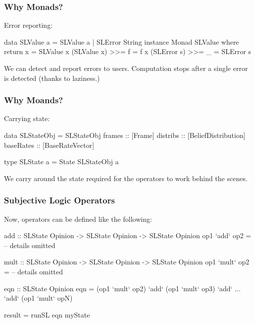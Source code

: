 \documentclass{beamer}
\begin{document}

\begin{frame}[fragile]
\frametitle{Why Monads?}

Error reporting:

\begin{code}
data SLValue a = SLValue a | SLError String
instance Monad SLValue where
  return x = SLValue x
  (SLValue x) >>= f = f x
  (SLError s) >>= _ = SLError s
\end{code}

We can detect and report errors to users. Computation stops after a single
error is detected (thanks to laziness.)

\end{frame}


\begin{frame}[fragile]
\frametitle{Why Moands?}

Carrying state:

\begin{code}
data SLStateObj = SLStateObj {
  frames :: [Frame]
  distribs :: [BeliefDistribution]
  baseRates :: [BaseRateVector]
}

type SLState a = State SLStateObj a
\end{code}

We carry around the state required for the operators to work behind the scenes.

\end{frame}


\begin{frame}[fragile]
\frametitle{Subjective Logic Operators}

Now, operators can be defined like the following:

\begin{code}
add :: SLState Opinion -> SLState Opinion -> SLState Opinion
op1 `add` op2 = -- details omitted

mult :: SLState Opinion -> SLState Opinion -> SLState Opinion
op1 `mult` op2 = -- details omitted

eqn :: SLState Opinion
eqn = (op1 `mult` op2) `add` (op1 `mult` op3)
                       `add`
                       ...
                       `add` (op1 `mult` opN)

result = runSL eqn myState
\end{code}

\end{frame}
\end{document}
